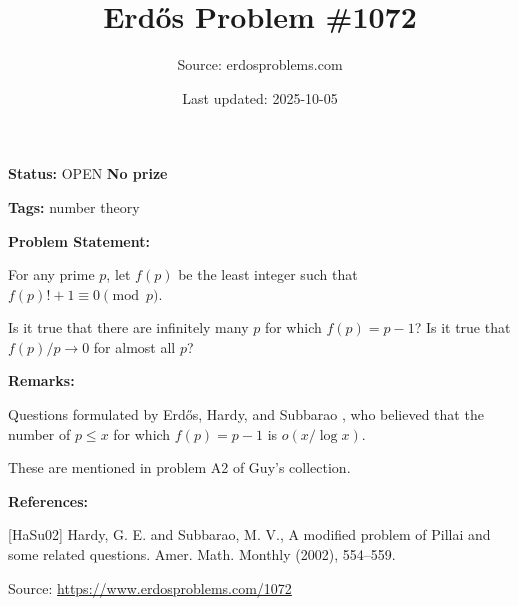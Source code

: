 \documentclass{article}
\title{Erd\H{o}s Problem \#1072}
\date{Last updated: 2025-10-05}
\author{Source: erdosproblems.com}
\begin{document}
\maketitle

\noindent\textbf{Status:} OPEN \quad \textbf{No prize}

\noindent\textbf{Tags:} number theory

\medskip
\noindent\textbf{Problem Statement:}

For any prime $p$, let $f(p)$ be the least integer such that $f(p)!+1\equiv 0\pmod{p}$.

Is it true that there are infinitely many $p$ for which $f(p)=p-1$?
Is it true that $f(p)/p\to 0$ for almost all $p$?

\bigskip
\noindent\textbf{Remarks:}

Questions formulated by Erd\H{o}s, Hardy, and Subbarao \cite{HaSu02}, who believed that the number of $p\leq x$ for which $f(p)=p-1$ is $o(x/\log x)$. 

These are mentioned in problem A2 of Guy's collection.

\bigskip
\noindent\textbf{References:}

[HaSu02] Hardy, G. E. and Subbarao, M. V., A modified problem of Pillai and some related questions. Amer. Math. Monthly (2002), 554--559.

\bigskip
\noindent\small{Source: \url{https://www.erdosproblems.com/1072}}
\end{document}
